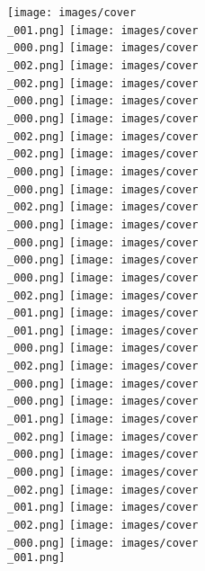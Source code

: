 \documentclass{article}%
\begin{document}
%
\normalsize%
\setmainfont[BoldFont={TwCen-Bold}, ItalicFont={TwCen-Regular}, BoldItalicFont={TwCen-Regular}]{TwCen-Regular}%
%
\newcommand\invisiblesection[1]{\refstepcounter{section}\addcontentsline{toc}{section}{#1}\markboth{#1}{#1}}%
\thispagestyle{empty}%
\hspace*{-3.6cm}%
\begin{minipage}{\textwidth}%
\vspace*{-3cm}%
\texttt{[image: images/cover\\\_001.png]}%
\texttt{[image: images/cover\\\_000.png]}%
\texttt{[image: images/cover\\\_002.png]}%
\texttt{[image: images/cover\\\_002.png]}%
\texttt{[image: images/cover\\\_000.png]}%
\texttt{[image: images/cover\\\_000.png]}%
\texttt{[image: images/cover\\\_002.png]}%
\texttt{[image: images/cover\\\_002.png]}%
\texttt{[image: images/cover\\\_000.png]}%
\newline%
\hspace*{-1.4425806364983056cm}%
\vspace*{-0.2cm}%
\texttt{[image: images/cover\\\_000.png]}%
\texttt{[image: images/cover\\\_002.png]}%
\texttt{[image: images/cover\\\_000.png]}%
\texttt{[image: images/cover\\\_000.png]}%
\texttt{[image: images/cover\\\_000.png]}%
\texttt{[image: images/cover\\\_000.png]}%
\texttt{[image: images/cover\\\_002.png]}%
\texttt{[image: images/cover\\\_001.png]}%
\texttt{[image: images/cover\\\_001.png]}%
\newline%
\hspace*{-1.974399908391998cm}%
\vspace*{-0.2cm}%
\texttt{[image: images/cover\\\_000.png]}%
\texttt{[image: images/cover\\\_002.png]}%
\texttt{[image: images/cover\\\_000.png]}%
\texttt{[image: images/cover\\\_000.png]}%
\texttt{[image: images/cover\\\_001.png]}%
\texttt{[image: images/cover\\\_002.png]}%
\texttt{[image: images/cover\\\_000.png]}%
\texttt{[image: images/cover\\\_000.png]}%
\texttt{[image: images/cover\\\_002.png]}%
\newline%
\hspace*{-1.8987248380695285cm}%
\vspace*{-0.2cm}%
\texttt{[image: images/cover\\\_001.png]}%
\texttt{[image: images/cover\\\_002.png]}%
\texttt{[image: images/cover\\\_000.png]}%
\texttt{[image: images/cover\\\_001.png]}%

\end{minipage}
\end{document}
